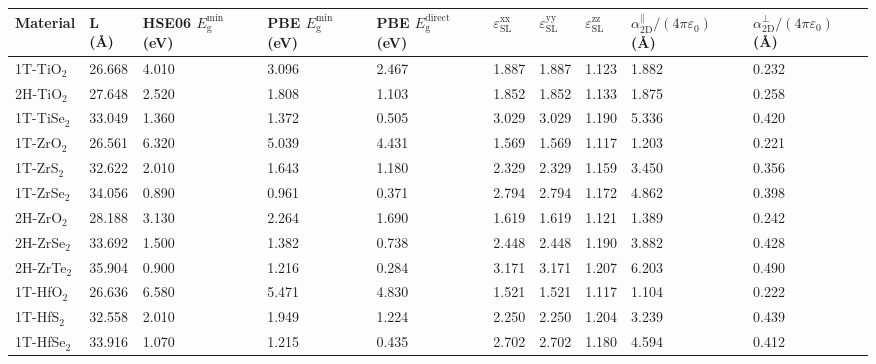 % 

\begin{center}
  \footnotesize
\setlongtables
\begin{tabularx}{1.1\linewidth}{lXXXXXXXXX}
      \caption{Raw data of the materials calculated in this study.}\\
    \hline
    Material & L (\AA) & HSE06 $E_{\mathrm{g}}^{\mathrm{min}}$ (eV) & PBE $E_{\mathrm{g}}^{\mathrm{min}}$ (eV) & PBE $E_{\mathrm{g}}^{\mathrm{direct}}$ (eV) & $\varepsilon_{\mathrm{SL}}^{\mathrm{xx}}$ & $\varepsilon_{\mathrm{SL}}^{\mathrm{yy}}$ & $\varepsilon_{\mathrm{SL}}^{\mathrm{zz}}$ & $\alpha_{\mathrm{2D}}^{\parallel}/(4\pi \varepsilon_{0})$ (\AA) & $\alpha_{\mathrm{2D}}^{\perp}/(4\pi \varepsilon_{0})$ (\AA)\\
    \hline
    \endhead
    1T-TiO$_{2}$ & 26.668  & 4.010  & 3.096  & 2.467  & 1.887  & 1.887  & 1.123  & 1.882  & 0.232 \\
    2H-TiO$_{2}$ & 27.648  & 2.520  & 1.808  & 1.103  & 1.852  & 1.852  & 1.133  & 1.875  & 0.258 \\
    1T-TiSe$_{2}$ & 33.049  & 1.360  & 1.372  & 0.505  & 3.029  & 3.029  & 1.190  & 5.336  & 0.420 \\
    1T-ZrO$_{2}$ & 26.561  & 6.320  & 5.039  & 4.431  & 1.569  & 1.569  & 1.117  & 1.203  & 0.221 \\
    1T-ZrS$_{2}$ & 32.622  & 2.010  & 1.643  & 1.180  & 2.329  & 2.329  & 1.159  & 3.450  & 0.356 \\
    1T-ZrSe$_{2}$ & 34.056  & 0.890  & 0.961  & 0.371  & 2.794  & 2.794  & 1.172  & 4.862  & 0.398 \\
    2H-ZrO$_{2}$ & 28.188  & 3.130  & 2.264  & 1.690  & 1.619  & 1.619  & 1.121  & 1.389  & 0.242 \\
    2H-ZrSe$_{2}$ & 33.692  & 1.500  & 1.382  & 0.738  & 2.448  & 2.448  & 1.190  & 3.882  & 0.428 \\
    2H-ZrTe$_{2}$ & 35.904  & 0.900  & 1.216  & 0.284  & 3.171  & 3.171  & 1.207  & 6.203  & 0.490 \\
    1T-HfO$_{2}$ & 26.636  & 6.580  & 5.471  & 4.830  & 1.521  & 1.521  & 1.117  & 1.104  & 0.222 \\
    1T-HfS$_{2}$ & 32.558  & 2.010  & 1.949  & 1.224  & 2.250  & 2.250  & 1.204  & 3.239  & 0.439 \\
    1T-HfSe$_{2}$ & 33.916  & 1.070  & 1.215  & 0.435  & 2.702  & 2.702  & 1.180  & 4.594  & 0.412 \\

\end{tabularx}
\end{center}
